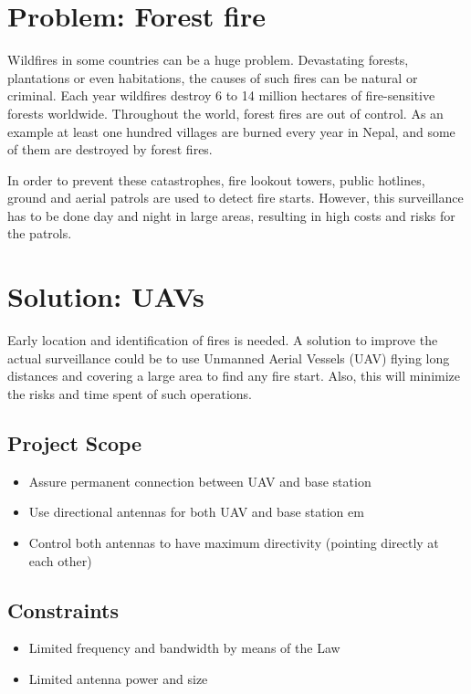 \section*{Problem: Forest fire}
Wildfires in some countries can be a huge problem. Devastating forests, plantations or even habitations, the causes of such fires can be natural or criminal.
Each year wildfires destroy 6 to 14 million hectares of fire-sensitive forests worldwide. Throughout the world, forest fires are out of control. As an example at least one hundred villages are burned every year in Nepal, and some of them are destroyed by forest fires.

In order to prevent these catastrophes, fire lookout towers, public hotlines, ground and aerial patrols are used to detect fire starts. However, this surveillance has to be done day and night in large areas, resulting in high costs and risks for the patrols.

\section*{Solution: UAVs}
Early location and identification of fires is needed. A solution to improve the actual surveillance could be to use Unmanned Aerial Vessels (UAV) flying long distances and covering a large area to find any fire start. Also, this will minimize the risks and time spent of such operations. 

\subsection*{Project Scope}
\begin{itemize}  
        \item{Assure permanent connection between UAV and base station}
        \item Use directional antennas for both UAV and base station em 
        \item Control both antennas to have maximum directivity (pointing directly at each other)
\end{itemize}

\subsection*{Constraints}
\begin{itemize}  
        \item{Limited frequency and bandwidth by means of the Law}
        \item{Limited antenna power and size}
\end{itemize}

